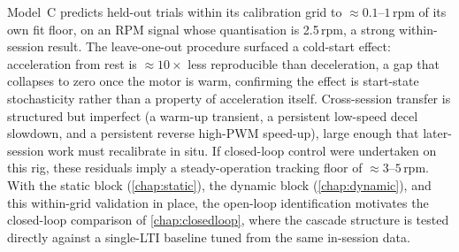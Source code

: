 Model~C predicts held-out trials within its calibration grid to ${\approx}0.1$--$1$\,rpm of its own fit floor, on an RPM signal whose quantisation is 2.5\,rpm, a strong within-session result. The leave-one-out procedure surfaced a cold-start effect: acceleration from rest is ${\approx}10\times$ less reproducible than deceleration, a gap that collapses to zero once the motor is warm, confirming the effect is start-state stochasticity rather than a property of acceleration itself. Cross-session transfer is structured but imperfect (a warm-up transient, a persistent low-speed decel slowdown, and a persistent reverse high-PWM speed-up), large enough that later-session work must recalibrate in situ. If closed-loop control were undertaken on this rig, these residuals imply a steady-operation tracking floor of ${\approx}3$--$5$\,rpm. With the static block (\cref{chap:static}), the dynamic block (\cref{chap:dynamic}), and this within-grid validation in place, the open-loop identification motivates the closed-loop comparison of \cref{chap:closedloop}, where the cascade structure is tested directly against a single-LTI baseline tuned from the same in-session data.
